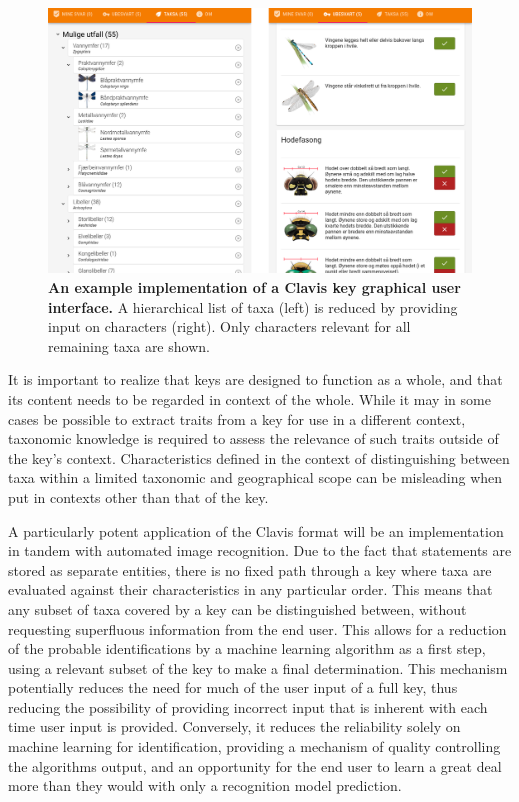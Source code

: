 \documentclass[10pt,letterpaper]{article}
\begin{document}
\begin{figure}[!h]
  \includegraphics[width=\textwidth]{Images/Fig5}
  \caption{{\bf An example implementation of a Clavis key graphical user interface.}
A hierarchical list of taxa (left) is reduced by providing input on characters (right). Only characters relevant for all remaining taxa are shown.
}
  \label{fig5}
\end{figure}

It is important to realize that keys are designed to function as a whole, and that its content needs to be regarded in context of the whole. While it may in some cases be possible to extract traits from a key for use in a different context, taxonomic knowledge is required to assess the relevance of such traits outside of the key's context. Characteristics defined in the context of distinguishing between taxa within a limited taxonomic and geographical scope can be misleading when put in contexts other than that of the key.

A particularly potent application of the Clavis format will be an implementation in tandem with automated image recognition. Due to the fact that statements are stored as separate entities, there is no fixed path through a key where taxa are evaluated against their characteristics in any particular order. This means that any subset of taxa covered by a key can be distinguished between, without requesting superfluous information from the end user. This allows for a reduction of the probable identifications by a machine learning algorithm as a first step, using a relevant subset of the key to make a final determination. This mechanism potentially reduces the need for much of the user input of a full key, thus reducing the possibility of providing incorrect input that is inherent with each time user input is provided. Conversely, it reduces the reliability solely on machine learning for identification, providing a mechanism of quality controlling the algorithms output, and an opportunity for the end user to learn a great deal more than they would with only a recognition model prediction.
\end{document}
